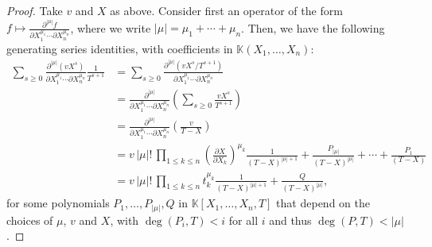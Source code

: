 \documentclass[12pt]{article}
\newcommand{\lf}{X}
\def\K{\mathbb{K}}
\def\K {\ensuremath{\mathbb{K}}}
\begin{document}
\begin{proof}
  Take $v$ and $\lf$ as above. Consider first an operator of the form $f
  \mapsto \frac{ \partial^{|\mu|} f} {\partial X_1^{\mu_1} \cdots
    \partial X_n^{\mu_n}}$, where we write
  $|\mu|=\mu_1+\cdots+\mu_n$. Then, we have the following generating
  series identities, with coefficients in $\K(X_1,\dots,X_n)$:
  \begin{align*}
    \sum_{s \ge 0} 
    \frac{ \partial^{|\mu|} ( v \lf^s )} {\partial X_1^{\mu_1} \cdots
      \partial X_n^{\mu_n}}
    \frac{1}{T^{s+1}} 
    &=  \sum_{s \ge 0} 
    \frac{ \partial^{|\mu|} (v \lf^s/T^{s+1})} {\partial X_1^{\mu_1} \cdots
      \partial X_n^{\mu_n}}\\
    &=  
    \frac{ \partial^{|\mu|} } {\partial X_1^{\mu_1} \cdots
      \partial X_n^{\mu_n}}
    \left (\sum_{s \ge 0} \frac{v \lf^s}{T^{s+1}}\right ) \\
    &= \frac{ \partial^{|\mu|} } {\partial X_1^{\mu_1} \cdots
      \partial X_n^{\mu_n}}
    \left (\frac v{T-\lf} \right ) \\
    &= v\, |\mu|!\, \prod_{1 \le k \le n} 
    \left (\frac{ \partial \lf} {\partial X_k} \right)^{\mu_k}
    \frac {1}{(T-\lf)^{|\mu|+1}} + \frac{P_{|\mu|}}{(T-\lf)^{|\mu|}} + \cdots + \frac{P_{1}}{(T-\lf)}\\
    &= v\, |\mu|!\, \prod_{1 \le k \le n} 
    t_k^{\mu_k}
    \frac {1}{(T-\lf)^{|\mu|+1}} + \frac{Q}{(T-\lf)^{|\mu|}},
  \end{align*}
  for some polynomials $P_1,\dots,P_{|\mu|},Q$ in $\K[X_1,\dots,X_n,T]$ that
  depend on the choices of $\mu$, $v$ and $X$, with $\deg(P_i,T) < i$
  for all $i$ and thus $\deg(P,T) < |\mu|$.
  

\end{proof}
\end{document}
